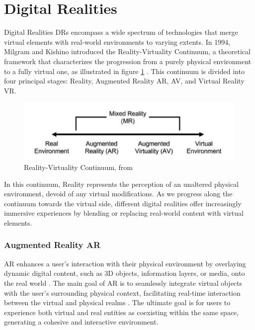 \section{Digital Realities} 

Digital Realities \ac{DRs} encompass a wide spectrum of technologies that merge virtual elements with real-world environments to varying extents. In 1994, Milgram and Kishino introduced the Reality-Virtuality Continuum, a theoretical framework that characterizes the progression from a purely physical environment to a fully virtual one, as illustrated in figure \ref{f:real-virtual-continuum} \cite{milgram1994}.
This continuum is divided into four principal stages: Reality, Augmented Reality \ac{AR}, \ac{AV}, and Virtual Reality \ac{VR}.

\begin{figure}[h]
    \centering
    \includegraphics[width=0.6\linewidth]{figs/mixed-reality-continuum.jpg}
    \caption{Reality-Virtuality Continuum, from \cite{milgram1994}}
    \label{f:real-virtual-continuum}
\end{figure}

In this continuum, Reality represents the perception of an unaltered physical environment, devoid of any virtual modifications. As we progress along the continuum towards the virtual side, different digital realities offer increasingly immersive experiences by blending or replacing real-world content with virtual elements.

\subsubsection{Augmented Reality \ac{AR}}
    \ac{AR} enhances a user's interaction with their physical environment by overlaying dynamic digital content, such as 3D objects, information layers, or media, onto the real world \cite{liu2022digitaltwin}. The main goal of \ac{AR} is to seamlessly integrate virtual objects with the user's surrounding physical context, facilitating real-time interaction between the virtual and physical realms \cite{Azuma1997}. The ultimate goal is for users to experience both virtual and real entities as coexisting within the same space, generating a cohesive and interactive environment.

